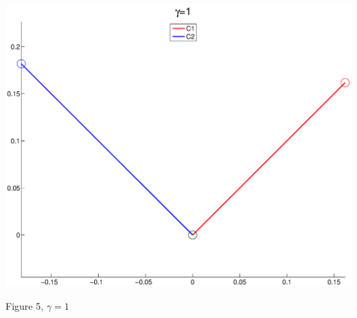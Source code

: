 \documentclass{article}
\begin{document}
\begin{center}
\includegraphics[width=\textwidth]{eigen5.eps}
\begin{footnotesize}
 Figure 5, $\gamma=1$
\end{footnotesize}
\end{center}
\end{document}
